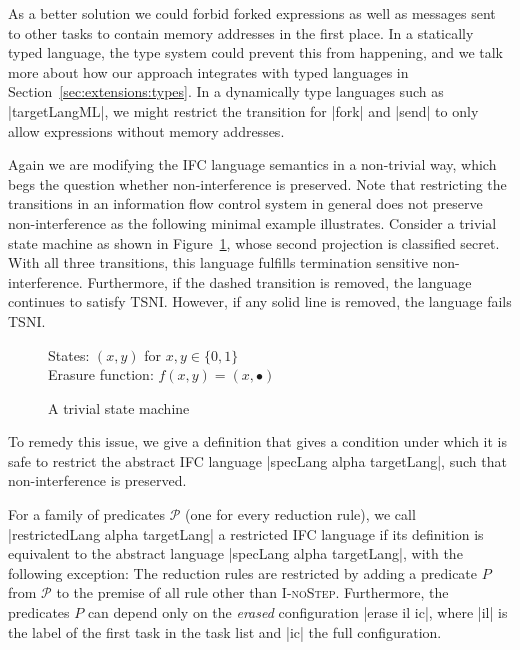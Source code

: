 As a better solution we could forbid forked expressions as well
as messages sent to other tasks to contain memory addresses in the
first place.  In a statically typed language, the type system could
prevent this from happening, and we talk more about how our
approach integrates with typed languages in
Section~\ref{sec:extensions:types}.
In a dynamically type languages such as |targetLangML|, we might
restrict the transition for |fork| and |send| to only allow expressions
without memory addresses.

Again we are modifying the IFC language semantics in a non-trivial way,
which begs the question whether non-interference is preserved.
Note that restricting the transitions in an information flow control
system in general does not preserve non-interference as the following
minimal example illustrates.
Consider a trivial state machine as shown
in Figure~\ref{fig:trivial-sm}, whose second projection is classified
secret.  With all three transitions, this language fulfills
termination sensitive non-interference.  Furthermore, if the
dashed transition
is removed, the language continues to satisfy TSNI.  However, if any
solid line is removed, the language fails TSNI.

\begin{figure}
  States: $(x,y)$ for $x,y \in \{0,1\}$ \\
  Erasure function: $f(x,y) = (x,\bullet)$
  
  \begin{center}\end{center}
  
  \label{fig:trivial-sm}
  \caption{A trivial state machine}
\end{figure}

To remedy this issue, we give a definition that gives a condition
under which it is safe to restrict the abstract IFC language
|specLang alpha targetLang|, such that non-interference is preserved.

\begin{definition}
  \label{def:restricted}
  For a family of predicates $\mathcal P$ (one for every reduction
  rule), we call
  |restrictedLang alpha targetLang| a restricted IFC language
  if its definition is equivalent to the abstract language
  |specLang alpha targetLang|, with the following exception:
  The reduction rules are restricted
  by adding a predicate $P$ from $\mathcal P$ to the premise of
  all rule other than \textsc{I-noStep}.  Furthermore, the predicates $P$
  can depend only on the \textit{erased} configuration
  |erase il ic|, where |il| is the label of the first task
  in the task list and |ic| the full configuration.
\end{definition}


